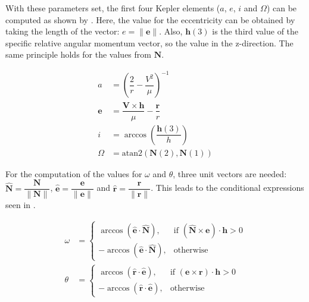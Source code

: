 With these parameters set, the first four Kepler elements ($a$, $e$, $i$ and $\Omega$) can be computed as shown by . Here, the value for the eccentricity can be obtained by taking the length of the vector: $e=\|\mathbf{e}\|$. Also, $\mathbf{h}(3)$ is the third value of the specific relative angular momentum vector, so the value in the z-direction. The same principle holds for the values from $\mathbf{N}$.

\begin{equation}\label{eq:carttokep4}
\begin{split}
a&=\left(\dfrac{2}{r}-\dfrac{V^{2}}{\mu}\right)^{-1}\\
\mathbf{e}&=\dfrac{\mathbf{V} \times \mathbf{h}}{\mu}-\dfrac{\mathbf{r}}{r}\\
i&=\arccos\left(\dfrac{\mathbf{h}(3)}{h}\right)\\
\Omega&=\text{atan}2\left(\mathbf{N}(2),\mathbf{N}(1)\right)
\end{split}
\end{equation}

For the computation of the values for $\omega$ and $\theta$, three unit vectors are needed: $\hat{\mathbf{N}}=\dfrac{\mathbf{N}}{\|\mathbf{N}\|}$, $\hat{\mathbf{e}}=\dfrac{\mathbf{e}}{\|\mathbf{e}\|}$ and $\hat{\mathbf{r}}=\dfrac{\mathbf{r}}{\|\mathbf{r}\|}$. This leads to the conditional expressions seen in . 



\begin{equation}\label{eq:omegathetacond}
\begin{split}
\omega&=\begin{cases}
\arccos\left(\hat{\mathbf{e}}\cdot\hat{\mathbf{N}}\right), & \text{if } \left(\hat{\mathbf{N}} \times \mathbf{e}\right) \cdot \mathbf{h}>0\\
-\arccos\left(\hat{\mathbf{e}}\cdot\hat{\mathbf{N}}\right), & \text{otherwise}
\end{cases}\\
\theta&=\begin{cases}
\arccos\left(\hat{\mathbf{r}}\cdot\hat{\mathbf{e}}\right), & \text{if } \left(\mathbf{e} \times \mathbf{r}\right) \cdot \mathbf{h}>0\\
-\arccos\left(\hat{\mathbf{r}}\cdot\hat{\mathbf{e}}\right), & \text{otherwise}
\end{cases}
\end{split}
\end{equation}

